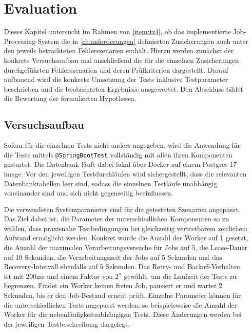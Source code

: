 \chapter{Evaluation}
\label{ch:evaluation}
Dieses Kapitel untersucht im Rahmen von \ref{item:tz4}, ob das implementierte Job-Processing-System die in \cref{ch:anforderungen} definierten
Zusicherungen auch unter den jeweils betrachteten Fehlerszenarien einhält.
Hierzu werden zunächst der konkrete Versuchsaufbau und anschließend die für die einzelnen Zusicherungen durchgeführten
Fehlerszenarien und deren Prüfkriterien dargestellt.
Darauf aufbauend wird die konkrete Umsetzung der Tests inklusive Testparameter beschrieben und die beobachteten Ergebnisse ausgewertet.
Den Abschluss bildet die Bewertung der formulierten Hypothesen.

\section{Versuchsaufbau}
\label{sec:versuchsaufbau}
Sofern für die einzelnen Tests nicht anders angegeben, wird die Anwendung für die Tests mittels \texttt{@SpringBootTest}
vollständig mit allen ihren Komponenten gestartet.
Die Datenbank läuft dabei lokal über Docker auf einem Postgres 17 image.
Vor den jeweiligen Testdurchläufen wird sichergestellt, dass die relevanten Datenbanktabellen leer sind, sodass
die einzelnen Testläufe unabhängig voneinander sind und sich nicht gegenseitig beeinflussen.

Die verwendeten Systemparameter sind für die getesteten Szenarien angepasst.
Das Ziel dabei ist, die Parameter der unterschiedlichen Komponenten so zu wählen, dass praxisnahe Testbedingungen bei
gleichzeitig vertretbarem zeitlichem Aufwand ermöglicht werden.
Konkret wurde die Anzahl der Worker auf 1 gesetzt, die Anzahl der maximalen Verarbeitungsversuche für Jobs auf 5, die Lease-Dauer
auf 10 Sekunden, die Verarbeitungszeit der Jobs auf 5 Sekunden und das Recovery-Intervall ebenfalls auf 5 Sekunden.
Das Retry- und Backoff-Verhalten ist mit 200ms und einem Faktor von $2^n$ gewählt, um die Laufzeit der Tests zu begrenzen.
Findet ein Worker keinen freien Job, pausiert er und wartet 2 Sekunden, bis er den Job-Bestand erneut prüft.
Einzelne Parameter können für die unterschiedlichen Tests angepasst werden, so beispielsweise die Anzahl der Worker für die
nebenläufigkeitsabhängigen Tests.
Diese Änderungen werden bei der jeweiligen Testbeschreibung dargelegt.

